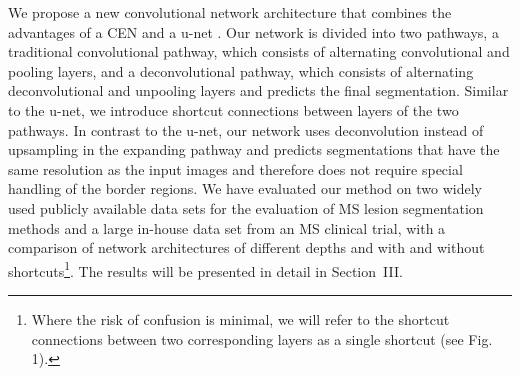 

We propose a new convolutional network architecture that combines the advantages
of a CEN \cite{brosch2015} and a u-net \cite{ronneberger2015}. Our
network is divided into two pathways, a traditional convolutional pathway, which
consists of alternating convolutional and pooling layers, and a deconvolutional
pathway, which consists of alternating deconvolutional and unpooling layers and
predicts the final segmentation. Similar to the u-net, we introduce shortcut
connections between layers of the two pathways. In contrast to the u-net, our
network uses deconvolution instead of upsampling in the expanding pathway and
predicts segmentations that have the same resolution as the input images and
therefore does not require special handling of the border regions. We have
evaluated our method on two widely used publicly available data sets for the
evaluation of MS lesion segmentation methods and a large in-house data set
from an MS clinical trial, with a comparison of network architectures of
different depths and with and without shortcuts\footnote{Where the risk of
confusion is minimal, we will refer to the shortcut connections between two
corresponding layers as a single shortcut (see Fig. 1).}. The results will be
presented in detail in Section~III.



